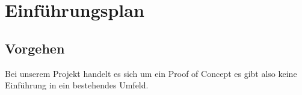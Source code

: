 \section{Einführungsplan}
\subsection{Vorgehen}
Bei unserem Projekt handelt es sich um ein Proof of Concept es gibt also keine Einführung in ein bestehendes Umfeld.
